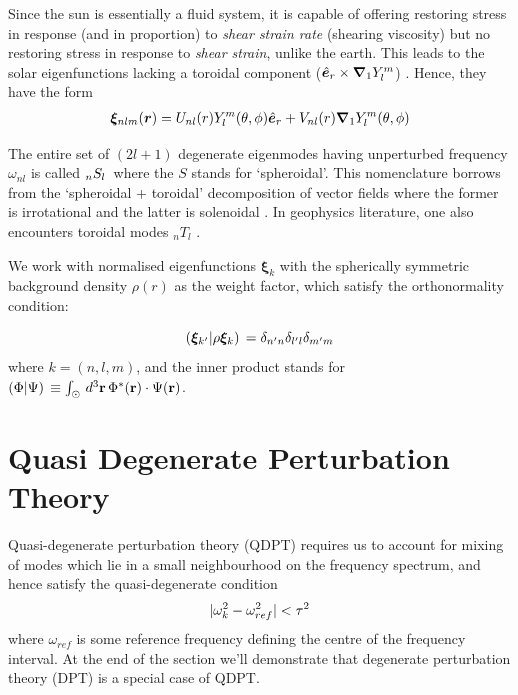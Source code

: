 Since the sun is essentially a fluid system, it is capable of offering restoring stress in response (and in proportion) to \textit{shear strain rate} (shearing viscosity) but no restoring stress in response to \textit{shear strain}, unlike the earth. This leads to the solar eigenfunctions lacking a toroidal component ($\hat{\bm{e}}_{r}\times \bm{\nabla}_1 Y_{l}^m$) \cite{jcd_notes}. Hence, they have the form
\begin{eqnarray} \label{eqn: xi_exp}
    \boldsymbol{\xi}_{nlm}(\boldsymbol{r}) =  U_{nl}(r) Y_l^m(\theta,\phi) \hat{\bm{e}}_{r}
 + V_{nl}(r) \boldsymbol{\nabla}_1 Y_l^m(\theta,\phi)
\end{eqnarray}
 
The entire set of $(2l+1)$ degenerate \snr eigenmodes having unperturbed frequency $\omega_{nl}$ is called $_{n}S_{l}\,$ where the $S$ stands for `spheroidal'. This nomenclature borrows from the `spheroidal + toroidal' decomposition of vector fields where the former is irrotational and the latter is solenoidal \cite{lavely92}. In geophysics literature, one also encounters toroidal modes $_nT_l$ \cite{DT98}.

We work with normalised eigenfunctions $\boldsymbol{\xi}_k$ with the spherically symmetric background density $\rho(r)$ as the weight factor, which satisfy the orthonormality condition:

\begin{equation} \label{eqn: orthonormality}
  (\bm{\xi}_{k'}|\rho\bm{\xi}_{k})\, = \delta_{n'n} \delta_{l' l} \delta_{m' m}  
\end{equation}
where $k = (n,l,m)$, and the inner product \inner{}{} stands for $(\Phi|\Psi)\, \equiv \int_{\odot} \, d^3\mathbf{r} \, \Phi^*(\mathbf{r})\cdot \Psi(\mathbf{r})$.

\section{Quasi Degenerate Perturbation Theory}
Quasi-degenerate perturbation theory (QDPT) requires us to account for mixing of modes which lie in a small neighbourhood on the frequency spectrum, and hence satisfy the quasi-degenerate condition
\begin{equation}\label{eqn:qdpt_cond}
|\omega_k^2 - \omega_{ref}^2| < \tau^2
\end{equation}
where $\omega_{ref}$ is some reference frequency defining the centre of the frequency interval. At the end of the section we'll demonstrate that degenerate perturbation theory (DPT) is a special case of QDPT.

